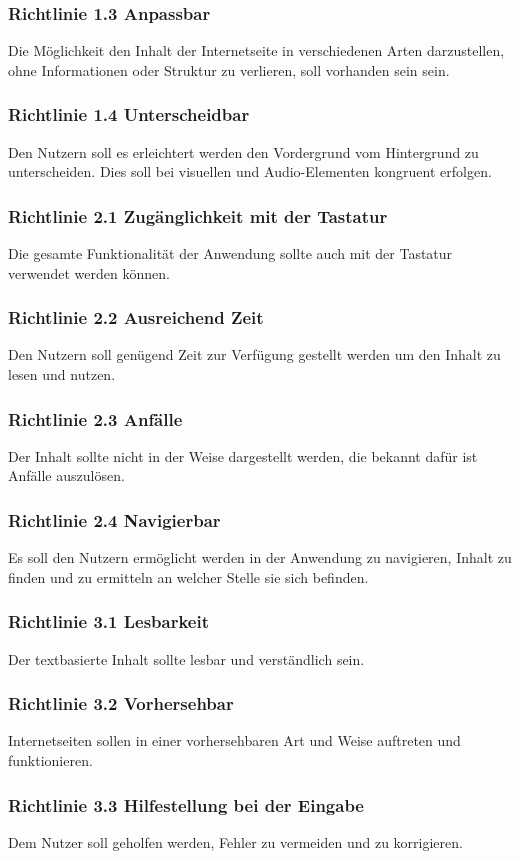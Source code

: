 \documentclass[12pt, paper=a4, bibtotoc, toc=listof, headsepline=true]{scrreprt}
\begin{document}
			\subsubsection{Richtlinie 1.3 Anpassbar}
			Die Möglichkeit den Inhalt der Internetseite in verschiedenen Arten darzustellen, ohne Informationen oder Struktur zu verlieren, soll vorhanden sein sein.
			\subsubsection{Richtlinie 1.4 Unterscheidbar}
			Den Nutzern soll es erleichtert werden den Vordergrund vom Hintergrund zu unterscheiden. Dies soll bei visuellen und Audio-Elementen kongruent erfolgen. 
			\subsubsection{Richtlinie 2.1 Zugänglichkeit mit der Tastatur}
			Die gesamte Funktionalität der Anwendung sollte auch mit der Tastatur verwendet werden können.
			\subsubsection{Richtlinie 2.2 Ausreichend Zeit}
			Den Nutzern soll genügend Zeit zur Verfügung gestellt werden um den Inhalt zu lesen und nutzen.
			\subsubsection{Richtlinie 2.3 Anfälle}
			Der Inhalt sollte nicht in der Weise dargestellt werden, die bekannt dafür ist Anfälle auszulösen.
			\subsubsection{Richtlinie 2.4 Navigierbar}
			Es soll den Nutzern ermöglicht werden in der Anwendung zu navigieren, Inhalt zu finden und zu ermitteln an welcher Stelle sie sich befinden.
			\subsubsection{Richtlinie 3.1 Lesbarkeit}
			Der textbasierte Inhalt sollte lesbar und verständlich sein.
			\subsubsection{Richtlinie 3.2 Vorhersehbar}
			Internetseiten sollen in einer vorhersehbaren Art und Weise auftreten und funktionieren.
			\subsubsection{Richtlinie 3.3 Hilfestellung bei der Eingabe}
			Dem Nutzer soll geholfen werden, Fehler zu vermeiden und zu korrigieren.
\end{document}
